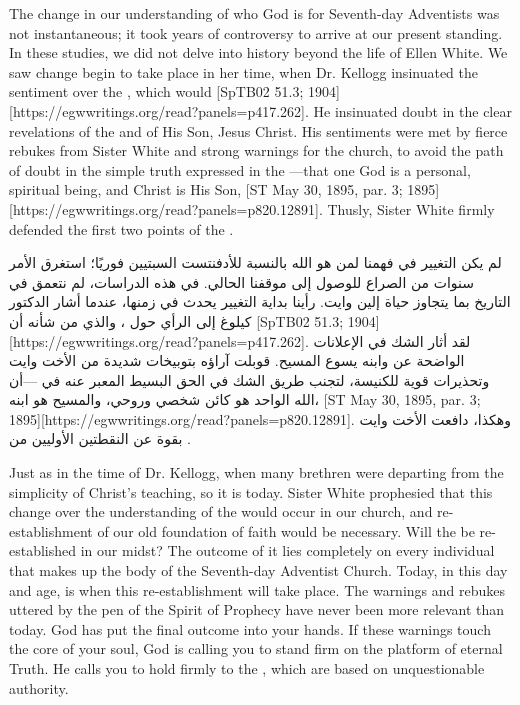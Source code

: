 The change in our understanding of who God is for Seventh-day Adventists was not instantaneous; it took years of controversy to arrive at our present standing. In these studies, we did not delve into history beyond the life of Ellen White. We saw change begin to take place in her time, when Dr. Kellogg insinuated the sentiment over the , which would [SpTB02 51.3; 1904][https://egwwritings.org/read?panels=p417.262]. He insinuated doubt in the clear revelations of the  and of His Son, Jesus Christ. His sentiments were met by fierce rebukes from Sister White and strong warnings for the church, to avoid the path of doubt in the simple truth expressed in the —that one God is a personal, spiritual being, and Christ is His Son, [ST May 30, 1895, par. 3; 1895][https://egwwritings.org/read?panels=p820.12891]. Thusly, Sister White firmly defended the first two points of the .


لم يكن التغيير في فهمنا لمن هو الله بالنسبة للأدفنتست السبتيين فوريًا؛ استغرق الأمر سنوات من الصراع للوصول إلى موقفنا الحالي. في هذه الدراسات، لم نتعمق في التاريخ بما يتجاوز حياة إلين وايت. رأينا بداية التغيير يحدث في زمنها، عندما أشار الدكتور كيلوغ إلى الرأي حول ، والذي من شأنه أن [SpTB02 51.3; 1904][https://egwwritings.org/read?panels=p417.262]. لقد أثار الشك في الإعلانات الواضحة عن  وابنه يسوع المسيح. قوبلت آراؤه بتوبيخات شديدة من الأخت وايت وتحذيرات قوية للكنيسة، لتجنب طريق الشك في الحق البسيط المعبر عنه في —أن الله الواحد هو كائن شخصي وروحي، والمسيح هو ابنه، [ST May 30, 1895, par. 3; 1895][https://egwwritings.org/read?panels=p820.12891]. وهكذا، دافعت الأخت وايت بقوة عن النقطتين الأوليين من .


Just as in the time of Dr. Kellogg, when many brethren were departing from the simplicity of Christ’s teaching, so it is today. Sister White prophesied that this change over the understanding of the  would occur in our church, and re-establishment of our old foundation of faith would be necessary. Will the  be re-established in our midst? The outcome of it lies completely on every individual that makes up the body of the Seventh-day Adventist Church. Today, in this day and age, is when this re-establishment will take place. The warnings and rebukes uttered by the pen of the Spirit of Prophecy have never been more relevant than today. God has put the final outcome into your hands. If these warnings touch the core of your soul, God is calling you to stand firm on the platform of eternal Truth. He calls you to hold firmly to the , which are based on unquestionable authority.


